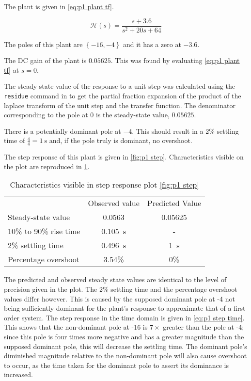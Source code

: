 \problem

The plant is given in \cref{eq:p1 plant tf}.

\begin{equation}
\label{eq:p1 plant tf}
\mathcal{H}\left(s\right) = \frac{s+3.6}{s^2+20s+64}
\end{equation}

The poles of this plant are $\left\{-16, -4\right\}$ and it has a zero at $-3.6$.

The DC gain of the plant is $0.05625$. This was found by evaluating \cref{eq:p1 plant tf} at $s=0$.

The steady-state value of the response to a unit step was calculated using the \texttt{residue} command in \matlab to get the partial fraction expansion of the product of the laplace transform of the unit step and the transfer function. The denominator corresponding to the pole at 0 is the steady-state value, $0.05625$.

There is a potentially dominant pole at $-4$. This should result in a 2\% settling time of $\frac{4}{4}=\SI{1}{\second}$ and, if the pole truly is dominant, no overshoot.

The step response of this plant is given in \cref{fig:p1 step}. Characteristics visible on the plot are reproduced in \cref{tab:p1 step characteristics}.

\begin{table}[h]
    \centering
    \caption{Characteristics visible in step response plot \cref{fig:p1 step}}
    \label{tab:p1 step characteristics}
    \begin{tabular}{lcc}
        \toprule
        &Observed value&Predicted Value\\
        Steady-state value&0.0563&0.05625\\
        10\% to 90\% rise time&\SI{0.105}{\second}&-\\
        2\% settling time&\SI{0.496}{\second}&\SI{1}{\second}\\
        Percentage overshoot&3.54\%&0\%\\
        \bottomrule
    \end{tabular}
\end{table}


The predicted and observed steady state values are identical to the level of precision given in the plot. The 2\% settling time and the percentage overshoot values differ however. This is caused by the supposed dominant pole at -4 not being sufficiently dominant for the plant's response to approximate that of a first order system. The step response in the time domain is given in \cref{eq:p1 step time}. This shows that the non-dominant pole at -16 is $7\times$ greater than the pole at -4; since this pole is four times more negative and has a greater magnitude than the supposed dominant pole, this will decrease the settling time. The dominant pole's diminished magnitude relative to the non-dominant pole will also cause overshoot to occur, as the time taken for the dominant pole to assert its dominance is increased.

